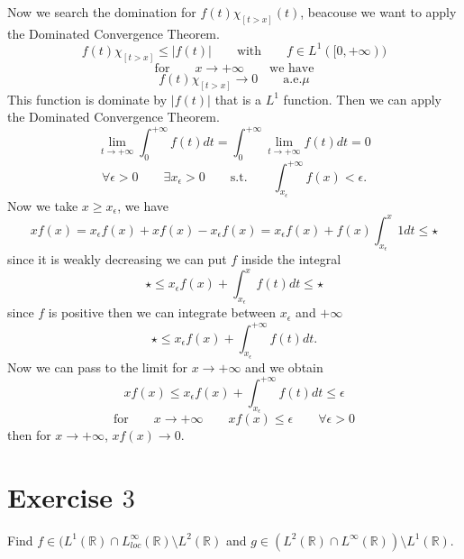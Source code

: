 \documentclass[a4paper, twoside, openany]{book}
\begin{document}
Now we search the domination for $f(t) \chi_{[t > x]}(t)$, beacouse we want to apply the Dominated Convergence Theorem.
$$f(t) \chi_{[t > x]} \leq |f(t)| \qquad \textrm{with} \qquad f \in L^1([0, +\infty))$$
$$\textrm{for} \qquad x \rightarrow +\infty \qquad \textrm{we have}$$
$$f(t) \chi_{[t > x]} \rightarrow 0 \qquad \textrm{a.e.} \mu$$
This function is dominate by $|f(t)|$ that is a $L^1$ function. Then we can apply the Dominated Convergence Theorem.
$$\lim_{t \rightarrow +\infty} \int_0^{+\infty} f(t) dt = \int_0^{+\infty} \lim_{t \rightarrow +\infty} f(t) dt = 0$$
$$\forall \epsilon > 0 \qquad \exists x_{\epsilon} > 0 \qquad \textrm{s.t.} \qquad \int_{x_{\epsilon}}^{+\infty} f(x) < \epsilon.$$
Now we take $x \geq x_{\epsilon}$, we have
$$x f(x) = x_{\epsilon} f(x) + x f(x) - x_{\epsilon} f(x) = x_{\epsilon} f(x) + f(x) \int_{x_{\epsilon}}^x 1 dt \leq \star$$
since it is weakly decreasing we can put $f$ inside the integral
$$\star \leq x_{\epsilon} f(x) + \int_{x_{\epsilon}}^x f(t) dt \leq \star$$
since $f$ is positive then we can integrate between $x_{\epsilon}$ and $+\infty$
$$\star \leq x_{\epsilon} f(x) + \int_{x_{\epsilon}}^{+\infty} f(t) dt.$$
Now we can pass to the limit for $x \rightarrow +\infty$ and we obtain
$$x f(x) \leq x_{\epsilon} f(x) + \int_{x_{\epsilon}}^{+\infty} f(t) dt \leq \epsilon$$
$$\textrm{for} \qquad x \rightarrow +\infty \qquad xf(x) \leq \epsilon \qquad \forall \epsilon >0$$
then for $x \rightarrow +\infty$, $xf(x) \rightarrow 0$.
\clearpage
\section*{Exercise $3$}
Find $f \in (L^1(\mathbb{R}) \cap L_{loc}^{\infty}(\mathbb{R}) \setminus L^2(\mathbb{R})$ and $g \in (L^2(\mathbb{R}) \cap L^{\infty}(\mathbb{R})) \setminus L^1(\mathbb{R})$.
\end{document}
